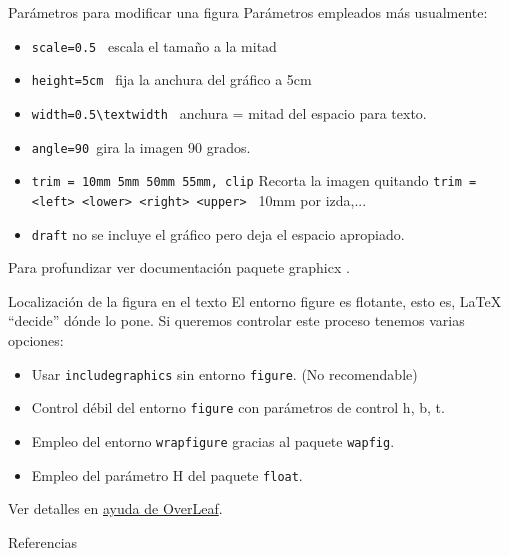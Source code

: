 \documentclass[10pt]{beamer}
\begin{document}
\begin{frame}[fragile]{Parámetros para modificar una figura}
Parámetros empleados más usualmente:
\begin{itemize}
    \item \verb|scale=0.5 | \hfill escala el tamaño a la mitad
    \item \verb|height=5cm | \hfill fija la anchura del gráfico a 5cm
    \item \verb|width=0.5\textwidth | \hfill anchura = mitad del espacio para texto.
    \item \verb|angle=90 |\hfill  gira la imagen 90 grados.
    \item \verb|trim = 10mm 5mm 50mm 55mm, clip| \hfill Recorta la imagen quitando
\verb|trim = <left> <lower> <right> <upper> | \hfill 10mm por izda,...
    \item \verb|draft| \hfill no se incluye el gráfico pero deja el espacio apropiado.
\end{itemize}
\vspace{1cm}
Para profundizar ver documentaci\'on paquete graphicx \cite{DocGraphicx} .
\end{frame}
\begin{frame}[fragile]{Localización de la figura en el texto}
El entorno figure es flotante, esto es, \LaTeX{} ``decide''
dónde lo pone. Si queremos controlar este proceso tenemos varias 
opciones:
\begin{itemize}
    \item Usar \verb|includegraphics| sin entorno \verb|figure|. \hfill (No recomendable)
    \item Control débil del entorno \verb|figure| con parámetros 
    de control h, b, t. 
    \item Empleo del entorno \verb|wrapfigure| \cite{wrapfigure} gracias al paquete \verb|wapfig|.
    \item Empleo del parámetro H del paquete \verb|float|.
\end{itemize}
\vspace{1cm}
Ver detalles en \href{https://www.overleaf.com/learn/latex/Positioning_images_and_tables}{ayuda de OverLeaf}.
\end{frame}
\begin{frame}[allowframebreaks]{Referencias}

%
\end{frame}
\end{document}
